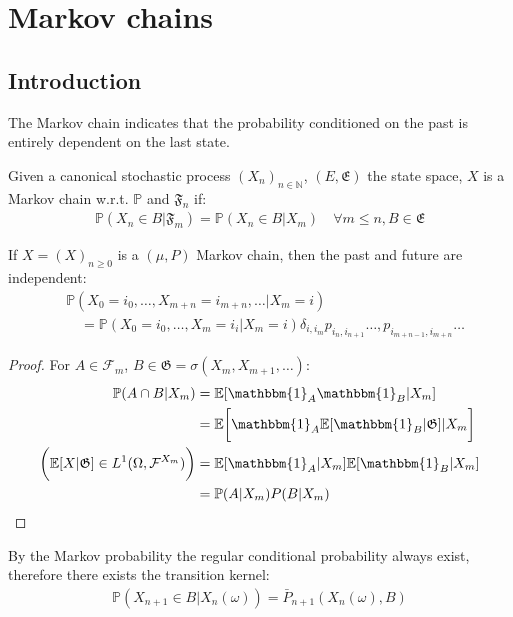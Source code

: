  
 
 
 \newpage
 \section{Markov chains}
 \subsection{Introduction}
 The Markov chain indicates that the probability conditioned on the past is entirely dependent on the last state. 
 \begin{definition}
 Given a canonical stochastic process $(X_n)_{n \in \mathbb{N}}$, $(E, \mathfrak{E})$ the state space, $X$ is a Markov chain w.r.t. $\mathbb{P}$ and $\mathfrak{F}_n$ if:
 \begin{align*}
 	\mathbb{P}(X_n\in B | \mathfrak{F}_m) = \mathbb{P}(X_n \in B|X_{m}) \quad \forall m \le n, B \in \mathfrak{E}
 \end{align*}
 \end{definition}
 
 \begin{lemma}
 	If $X = (X)_{n \geq 0}$ is a $(\mu, P)$ Markov chain, then the past and future are independent:
 	\begin{align*}
 		&\mathbb{P}(X_0 = i_0, \dots, X_{m+n} = i_{m+n}, \dots|X_m = i)\\
		&\quad = \mathbb{P}(X_0 = i_0, \dots,X_m = i_i |X_m = i)
		\delta_{i,i_m} p_{i_n, i_{n+1}}\dots, p_{i_{m+n-1}, i_{m+n}}\dots
 	\end{align*}
 \end{lemma}
  \begin{proof}
 For $A \in \mathcal{F}_m$, $B \in \mathfrak{G} = \sigma(X_m, X_{m+1}, \dots)$:
 \begin{align*}
 	\mathbb{P}(A \cap B|X_m) &= \mathbb{E}[\mathbbm{1}_{A} \mathbbm{1}_{B}|X_m]\\
 	&= \mathbb{E}\bigg[\mathbbm{1}_{A}\mathbb{E}[\mathbbm{1}_{B}|\mathfrak{G}]|X_m\bigg]\\
 \bigg(\mathbb{E}[X|\mathfrak{G}]\in L^1(\Omega, \mathcal{F}^{X_m})\bigg)
  	&= \mathbb{E}[\mathbbm{1}_{A}|X_m] \mathbb{E}[\mathbbm{1}_{B}|X_m]\\
 	&= \mathbb{P}(A|X_m) P(B|X_m)
 \end{align*}
\end{proof}
 
\begin{remark} By the Markov probability the regular conditional probability always exist, therefore there exists the transition kernel:
 \begin{align*}
 	\mathbb{P}(X_{n+1} \in B | X_n(\omega)) =  \bar{P}_{n+1}(X_n(\omega), B)
 \end{align*}
 \end{remark}
 
